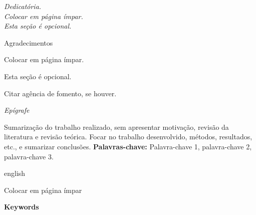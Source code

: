\documentclass[
	12pt,				%
	openright,			%
	oneside,			%
	a4paper,			%
	english,			%
	french,				%
	spanish,			%
	brazil				%
	]{abntex2}
\begin{document}
\begin{dedicatoria}
   \vspace*{\fill}
   \centering
   \noindent
   \vspace*{0.75\textheight}
   \begin{flushright}
    \DoubleSpacing
   \textit{ Dedicatória. \\
   	Colocar em página ímpar. \\
   	Esta seção é opcional.} 
	\end{flushright}
	\vspace*{\fill}
\end{dedicatoria}
\textual 
\frontmatter
\begin{agradecimentos}
Agradecimentos

Colocar em página ímpar.

Esta seção é opcional.

Citar agência de fomento, se houver.


\end{agradecimentos}

\begin{epigrafe}
    \vspace*{\fill}
	\begin{flushright}
		\textit{Epígrafe}
	\end{flushright}
\end{epigrafe}


\setlength{\absparsep}{18pt} %
\begin{resumo}
Sumarização do trabalho realizado, sem apresentar motivação, revisão da literatura e revisão teórica. Focar no trabalho desenvolvido, métodos, resultados, etc., e sumarizar conclusões.
\textbf{Palavras-chave:} Palavra-chave 1, palavra-chave 2, palavra-chave 3.

\end{resumo}

\begin{resumo}[Abstract]
 \begin{otherlanguage*}{english}
	
	
	Colocar em página ímpar

   \vspace{\onelineskip}
 
   \noindent 
   \textbf{Keywords}
 \end{otherlanguage*}
\end{resumo}
\end{document}
